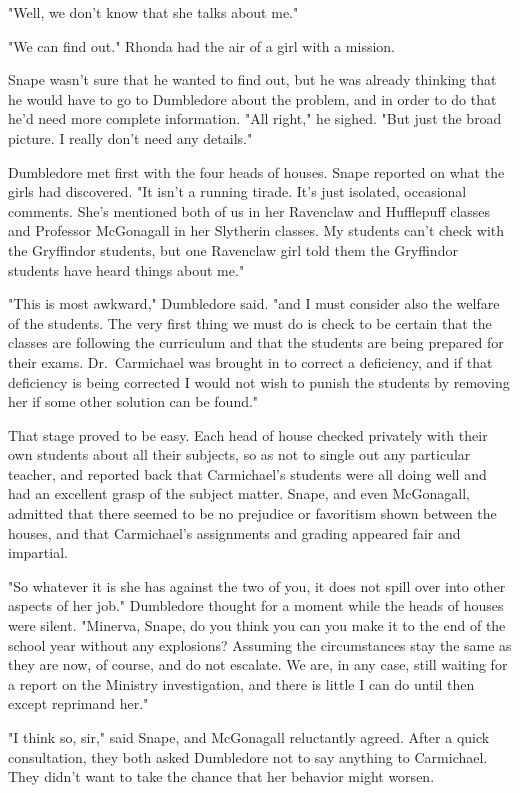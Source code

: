 "Well, we don't know that she talks about me."

"We can find out." Rhonda had the air of a girl with a mission.

Snape wasn't sure that he wanted to find out, but he was already thinking that he would have to go to Dumbledore about the problem, and in order to do that he'd need more complete information. "All right," he sighed. "But just the broad picture. I really don't need any details."

Dumbledore met first with the four heads of houses. Snape reported on what the girls had discovered. "It isn't a running tirade. It's just isolated, occasional comments. She's mentioned both of us in her Ravenclaw and Hufflepuff classes and Professor McGonagall in her Slytherin classes. My students can't check with the Gryffindor students, but one Ravenclaw girl told them the Gryffindor students have heard things about me."

"This is most awkward," Dumbledore said. "and I must consider also the welfare of the students. The very first thing we must do is check to be certain that the classes are following the curriculum and that the students are being prepared for their exams. Dr.~Carmichael was brought in to correct a deficiency, and if that deficiency is being corrected I would not wish to punish the students by removing her if some other solution can be found."

That stage proved to be easy. Each head of house checked privately with their own students about all their subjects, so as not to single out any particular teacher, and reported back that Carmichael's students were all doing well and had an excellent grasp of the subject matter. Snape, and even McGonagall, admitted that there seemed to be no prejudice or favoritism shown between the houses, and that Carmichael's assignments and grading appeared fair and impartial.

"So whatever it is she has against the two of you, it does not spill over into other aspects of her job." Dumbledore thought for a moment while the heads of houses were silent. "Minerva, Snape, do you think you can you make it to the end of the school year without any explosions? Assuming the circumstances stay the same as they are now, of course, and do not escalate. We are, in any case, still waiting for a report on the Ministry investigation, and there is little I can do until then except reprimand her."

"I think so, sir," said Snape, and McGonagall reluctantly agreed. After a quick consultation, they both asked Dumbledore not to say anything to Carmichael. They didn't want to take the chance that her behavior might worsen.

